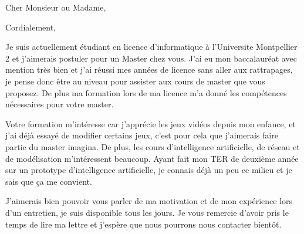 \documentclass[11pt,letterpaper,sans]{moderncv}        %
\begin{document}
\date{\today}
\opening{Cher Monsieur ou Madame,}
\closing{Cordialement,} %

\makelettertitle

Je suis actuellement étudiant en licence d'informatique à l'Universite Montpellier 2 et j'aimerais postuler pour un Master chez vous. J'ai eu mon baccalauréat avec mention très bien et j'ai réussi mes années de licence sans aller aux rattrapages, je pense donc être au niveau pour assister aux cours de master que vous proposez. De plus ma formation lors de ma licence m'a donné les compétences nécessaires pour votre master.

Votre formation m'intéresse car j'apprécie les jeux vidéos depuis mon enfance, et j'ai déjà essayé de modifier certains jeux, c'est pour cela que j'aimerais faire partie du master imagina. De plus, les cours d'intelligence artificielle, de réseau et de modélisation m'intéressent beaucoup. Ayant fait mon TER de deuxième année sur un prototype d'intelligence artificielle, je connais déjà un peu ce milieu et je sais que ça me convient.

J'aimerais bien pouvoir vous parler de ma motivation et de mon expérience lors d'un entretien, je suis disponible tous les jours. Je vous remercie d'avoir pris le temps de lire ma lettre et j'espère que nous pourrons nous contacter bientôt. 

\makeletterclosing
\end{document}
